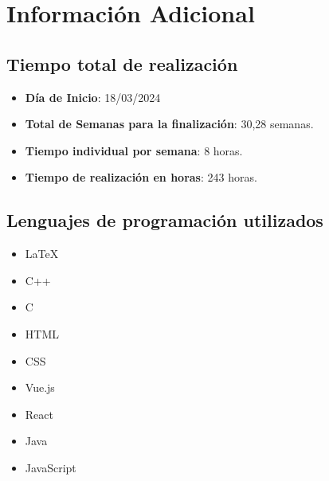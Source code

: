         \section{Información Adicional}
            \subsection{Tiempo total de realización}
                \begin{itemize} [label=•]
                    \setlength{\itemindent}{2.5em}
                        \item \textbf{Día de Inicio}: 18/03/2024
                        \item \textbf{Total de Semanas para la finalización}: 30,28 semanas.
                        \item \textbf{Tiempo individual por semana}: 8 horas.
                        \item \textbf{Tiempo de realización en horas}: 243 horas.
                \end{itemize}
                
            \subsection{Lenguajes de programación utilizados}
                \begin{itemize} [label=•]
                    \setlength{\itemindent}{2.5em}
                        \item \LaTeX
                        \item C++
                        \item C
                        \item HTML
                        \item CSS
                        \item Vue.js
                        \item React
                        \item Java
                        \item JavaScript
                \end{itemize}
                
